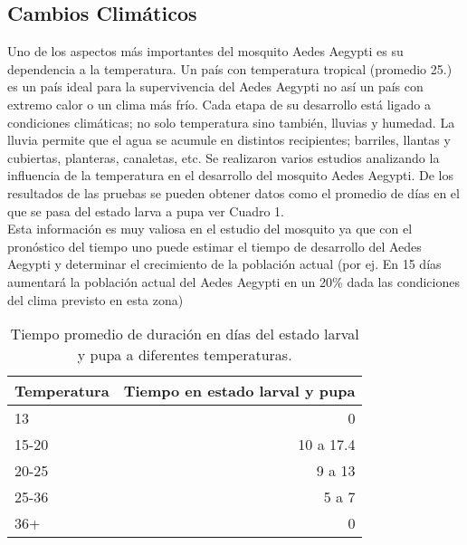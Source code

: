 \subsection{Cambios Climáticos}
Uno de los aspectos más importantes del mosquito Aedes Aegypti es su dependencia a la temperatura. Un país con temperatura tropical (promedio 25\textcelsius.) es un país ideal para la supervivencia del Aedes Aegypti no así un país con extremo calor o un clima más frío. Cada etapa de su desarrollo está ligado a condiciones climáticas; no solo temperatura sino también, lluvias y humedad. La lluvia permite que el agua se acumule en distintos recipientes; barriles, llantas y cubiertas, planteras, canaletas, etc. Se realizaron varios estudios analizando la influencia de la temperatura en el desarrollo del mosquito Aedes Aegypti. De los resultados de las pruebas se pueden obtener datos como el promedio de días en el que se pasa del estado larva a pupa ver Cuadro 1.\\

Esta información es muy valiosa en el estudio del mosquito ya que con el pronóstico del tiempo uno puede estimar el tiempo de desarrollo del Aedes Aegypti y determinar el crecimiento de la población actual (por ej. En 15 días aumentará la población actual del Aedes Aegypti en un 20\% dada las condiciones del clima previsto en esta zona)

\begin{table}
\centering
\begin{tabular}{l|r}
Temperatura & Tiempo en estado larval y pupa \\\hline
13 & 0 \\
15-20 & 10 a 17.4 \\
20-25 & 9 a 13 \\
25-36 & 5 a 7 \\
36+ & 0
\end{tabular}
\caption{\label{tab:widgets}Tiempo promedio de duración en días del estado larval y pupa a diferentes temperaturas.}
\end{table}
